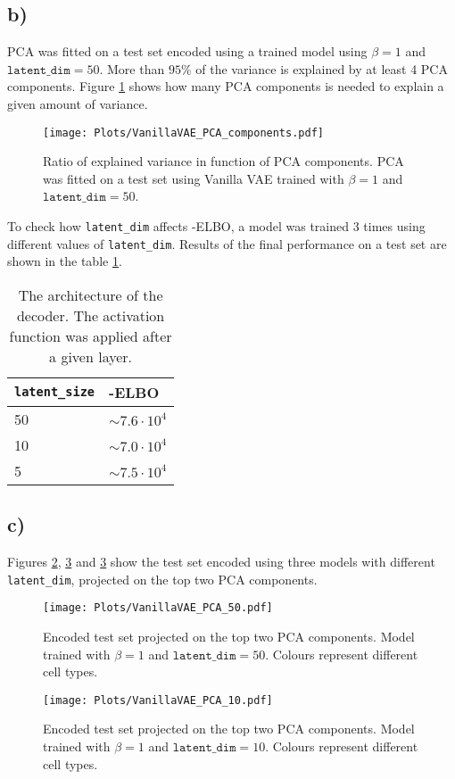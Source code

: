 \documentclass[a4paper,11pt]{article}
\begin{document}
\subsection*{b)}
PCA was fitted on a test set encoded using a trained model using $\beta=1$ and $\texttt{latent\_dim}=50$.
More than $95\%$ of the variance is explained by at least 4 PCA components. Figure \ref{PCA1} shows how many PCA components is needed to explain a given amount of variance.
\begin{figure}[H]
    \centering
    \texttt{[image: Plots/VanillaVAE\_PCA\_components.pdf]}
    \caption{Ratio of explained variance in function of PCA components. PCA was fitted on a test set using Vanilla VAE trained with $\beta = 1$ and $\texttt{latent\_dim}=50$.}
    \label{PCA1}
\end{figure}
\noindent To check how \texttt{latent\_dim} affects -ELBO, a model was trained 3 times using different values of \texttt{latent\_dim}. Results of the final performance on a test set are shown in the table \ref{PCATab}.
\begin{table}[H]
\centering
\begin{tabular}{|l|l|}
\hline
 \textbf{\texttt{latent\_size}} & \textbf{-ELBO} \\ \hline
 50 & $\sim7.6\cdot10^{4}$  \\ \hline
 10 & $\sim7.0\cdot10^{4}$  \\ \hline
 5 & $\sim7.5\cdot10^{4}$  \\ \hline
\end{tabular}
\caption{The architecture of the decoder. The activation function was applied after a given layer.}
\label{PCATab}
\end{table}

\subsection*{c)}
Figures \ref{PCA2}, \ref{PCA3} and \ref{PCA3} show the test set encoded using three models with different \texttt{latent\_dim}, projected on the top two PCA components.
\begin{figure}[H]
    \centering
    \texttt{[image: Plots/VanillaVAE\_PCA\_50.pdf]}
    \caption{Encoded test set projected on the top two PCA components. Model trained with $\beta=1$ and $\texttt{latent\_dim}=50$. Colours represent different cell types.}
    \label{PCA2}
\end{figure}

\begin{figure}[H]
    \centering
    \texttt{[image: Plots/VanillaVAE\_PCA\_10.pdf]}
    \caption{Encoded test set projected on the top two PCA components. Model trained with $\beta=1$ and $\texttt{latent\_dim}=10$. Colours represent different cell types. }
    \label{PCA3}
\end{figure}
\end{document}
